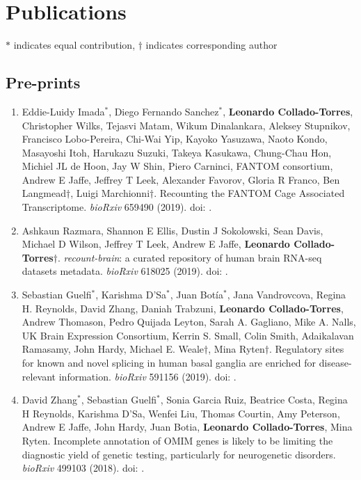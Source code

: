 \section{Publications}

$*$ indicates equal contribution, $\dagger$ indicates corresponding author

\subsection{Pre-prints}
    \begin{enumerate}
        \item Eddie-Luidy Imada$^{*}$, Diego Fernando Sanchez$^{*}$, \textbf{Leonardo Collado-Torres}, Christopher Wilks, Tejasvi Matam, Wikum Dinalankara, Aleksey Stupnikov, Francisco Lobo-Pereira, Chi-Wai Yip, Kayoko Yasuzawa, Naoto Kondo, Masayoshi Itoh, Harukazu Suzuki, Takeya Kasukawa, Chung-Chau Hon, Michiel JL de Hoon, Jay W Shin, Piero Carninci, FANTOM consortium, Andrew E Jaffe, Jeffrey T Leek, Alexander Favorov, Gloria R Franco, Ben Langmead$\dagger$, Luigi Marchionni$\dagger$. Recounting the FANTOM Cage Associated Transcriptome. \emph{bioRxiv} 659490 (2019). doi: .
        
        \item Ashkaun Razmara, Shannon E Ellis, Dustin J Sokolowski, Sean Davis, Michael D Wilson, Jeffrey T Leek, Andrew E Jaffe, \textbf{Leonardo Collado-Torres}$\dagger$. \emph{recount-brain}: a curated repository of human brain RNA-seq datasets metadata. \emph{bioRxiv} 618025 (2019). doi: .
        
        \item Sebastian Guelfi$^{*}$, Karishma D’Sa$^{*}$, Juan Botía$^{*}$, Jana Vandrovcova, Regina H. Reynolds, David Zhang, Daniah Trabzuni, \textbf{Leonardo Collado-Torres}, Andrew Thomason, Pedro Quijada Leyton, Sarah A. Gagliano, Mike A. Nalls, UK Brain Expression Consortium, Kerrin S. Small, Colin Smith, Adaikalavan Ramasamy, John Hardy, Michael E. Weale$\dagger$, Mina Ryten$\dagger$. Regulatory sites for known and novel splicing in human basal ganglia are enriched for disease-relevant information. \emph{bioRxiv} 591156 (2019). doi: .
        
        \item David Zhang$^{*}$, Sebastian Guelfi$^{*}$, Sonia Garcia Ruiz, Beatrice Costa, Regina H Reynolds, Karishma D'Sa, Wenfei Liu, Thomas Courtin, Amy Peterson, Andrew E Jaffe, John Hardy, Juan Botia, \textbf{Leonardo Collado-Torres}, Mina Ryten. Incomplete annotation of OMIM genes is likely to be limiting the diagnostic yield of genetic testing, particularly for neurogenetic disorders. \emph{bioRxiv} 499103 (2018). doi: .
        

\end{enumerate}
